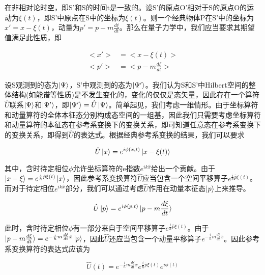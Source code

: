\documentclass[a4paper]{article}
\begin{document}
        在非相对论时空，即S'和S的时间t是一致的。设S'的原点O'相对于S的原点O的运动为$\xi(t)$，即S'中原点在S中的坐标为$\xi(t)$。则一个经典物体P在S'中的坐标为$x'=x-\xi(t)$，动量为$p'=p-m\frac{d\xi}{dt}$。那么在量子力学中，我们应当要求其期望值满足此性质，即
    
        \begin{equation}\label{classical-translation}
            \begin{split}
                <x'>&=<x-\xi(t)>      \\
                <p'>&=<p-m\frac{d\xi}{dt}>
            \end{split}
        \end{equation}
    
        设S观测到的态为$\ket{\Psi}$，S'中观测到的态为$\ket{\Psi'}$。我们认为S和S'中Hilbert空间的整体结构(如能谱等性质)是不发生变化的，变化的仅仅是态矢量，因此存在一个算符$\hat{U}$联系$\ket{\Psi}$和$\ket{\Psi'}$，即$\ket{\Psi'}=\hat{U}\ket{\Psi}$。简单起见，我们考虑一维情形。由于坐标算符和动量算符的全体本征态分别构成态空间的一组基，因此我们只需要考虑坐标算符和动量算符的本征态在参考系变换下的变换关系，即可知道任意态在参考系变换下的变换关系，即得到$\hat{U}$的表达式。根据经典参考系变换的结果，我们可以要求

        \begin{equation}
            \hat{U}\ket{x}=e^{i\phi(x,t)}\ket{x-\xi(t)}
        \end{equation}

        其中，含时待定相位$\phi$允许坐标算符的e指数$e^{ik\hat{x}}$给出一个贡献。由于$\ket{x-\xi}=e^{\frac{i}{\hbar}\hat{p}\xi(t)}\ket{x}$，因此参考系变换算符$\hat{U}$应当包含一个空间平移算子$e^{\frac{i}{\hbar}\hat{p}\xi(t)}$。而对于待定相位$e^{ik\hat{x}}$部分，我们可以通过考虑$\hat{U}$作用在动量本征态$\ket{p}$上来推导。

        \begin{equation}
            \hat{U}\ket{p}=e^{i\phi(p,t)}\ket{p-m\frac{d\xi}{dt}}
        \end{equation}

        此时，含时待定相位$\phi$有一部分来自于空间平移算子$e^{\frac{i}{\hbar}\hat{p}\xi(t)}$。由于$\ket{p-m\frac{d\xi}{dt}}=e^{-\frac{i}{\hbar}m\frac{d\xi}{dt}\hat{x}}\ket{p}$，因此$\hat{U}$还应当包含一个动量平移算子$e^{-\frac{i}{\hbar}m\frac{d\xi}{dt}\hat{x}}$。因此参考系变换算符的表达式应该为

        \begin{equation}\label{Utmp}
            \hat{U}(t)=e^{-\frac{i}{\hbar}m\frac{d\xi}{dt}\hat{x}}e^{\frac{i}{\hbar}\hat{p}\xi(t)}e^{i\phi(t)} 
        \end{equation}
\end{document}

